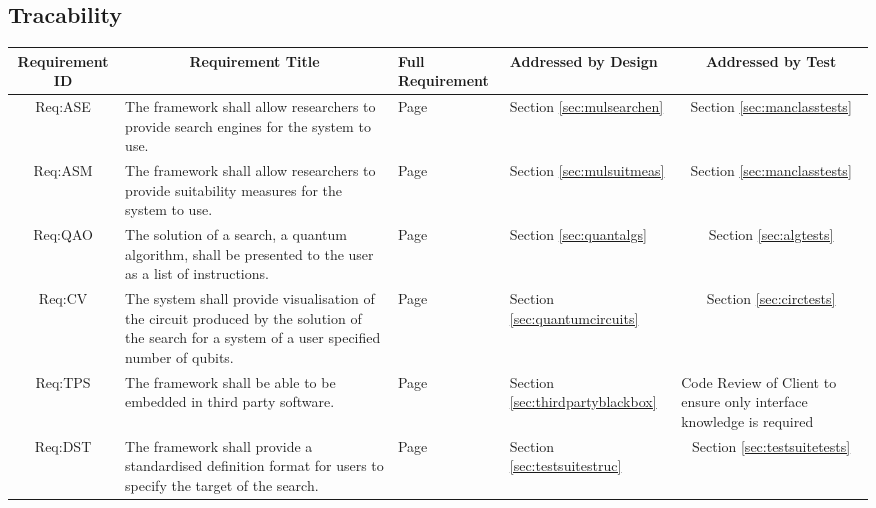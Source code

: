 \clearpage
\begin{landscape}
\section{Tracability}
\label{sec:tracability}

\centering
\noindent\begin{longtable}{|c|m{10cm}|m{3cm}|m{3cm}|m{4cm}|}
\hline
\textbf{Requirement ID} &
\multicolumn{1}{c|}{\textbf{Requirement Title}} &
\textbf{Full Requirement} &
\textbf{Addressed by Design} &
\multicolumn{1}{c|}{\textbf{Addressed by Test}} \\ \hline

Req:ASE &
The framework shall allow researchers to provide search engines for the system to use. &
Page \pageref{sec:reqase} &
Section \ref{sec:mulsearchen} &
\multicolumn{1}{c|}{Section \ref{sec:manclasstests}}\\ \hline

Req:ASM &
The framework shall allow researchers to provide suitability measures for the system to use. &
Page \pageref{sec:reqasm} &
Section \ref{sec:mulsuitmeas} &
\multicolumn{1}{c|}{Section \ref{sec:manclasstests}}\\ \hline

Req:QAO &
The solution of a search, a quantum algorithm, shall be presented to the user as a list of instructions. &
Page \pageref{sec:reqqao} &
Section \ref{sec:quantalgs} &
\multicolumn{1}{c|}{Section \ref{sec:algtests}} \\ \hline

Req:CV &
The system shall provide visualisation of the circuit produced by the solution of the search for a system of a user specified number of qubits. &
Page \pageref{sec:reqcv} &
Section \ref{sec:quantumcircuits} &
\multicolumn{1}{c|}{Section \ref{sec:circtests}} \\ \hline

Req:TPS &
The framework shall be able to be embedded in third party software. &
Page \pageref{sec:reqtps} &
Section \ref{sec:thirdpartyblackbox} &
Code Review of Client to ensure only interface knowledge is required\\ \hline

Req:DST &
The framework shall provide a standardised definition format for users to specify the target of the search. &
Page \pageref{sec:reqdst} &
Section \ref{sec:testsuitestruc} &
\multicolumn{1}{c|}{Section \ref{sec:testsuitetests}} \\ \hline


\end{longtable}
\end{landscape}
